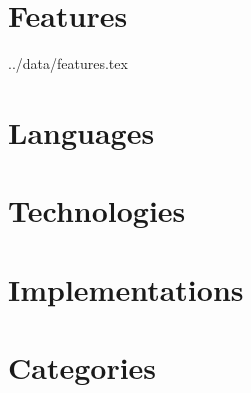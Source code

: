 \documentclass{article}
\begin{document}
\tableofcontents

\pagebreak

\section{Features}

 {../data/features.tex}

\pagebreak


\section{Languages}



\pagebreak


\section{Technologies}



\pagebreak


\section{Implementations}



\pagebreak

\section{Categories}


\end{document}
